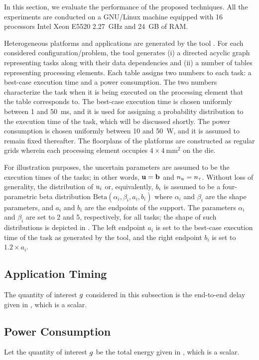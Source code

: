 In this section, we evaluate the performance of the proposed techniques. All the
experiments are conducted on a GNU/Linux machine equipped with 16 processors
Intel Xeon E5520 2.27~GHz and 24~GB of RAM.

Heterogeneous platforms and applications are generated by the  tool
\cite{dick1998}. For each considered configuration/problem, the tool generates
(i) a directed acyclic graph representing tasks along with their data
dependencies and (ii) a number of tables representing processing elements. Each
table assigns two numbers to each task: a best-case execution time and a power
consumption. The two numbers characterize the task when it is being executed on
the processing element that the table corresponds to. The best-case execution
time is chosen uniformly between 1 and 50~ms, and it is used for assigning a
probability distribution to the execution time of the task, which will be
discussed shortly. The power consumption is chosen uniformly between 10 and
50~W, and it is assumed to remain fixed thereafter. The floorplans of the
platforms are constructed as regular grids wherein each processing element
occupies $4 \times 4~\text{mm}^2$ on the die.


For illustration purposes, the uncertain parameters are assumed to be the
execution times of the tasks; in other words, $\mathbf{u} = \mathbf{b}$ and ${n_u} = {n_\tau}$.
Without loss of generality, the distribution of $u_i$ or, equivalently, $b_i$
is assumed to be a four-parametric beta distribution $\text{Beta}(\alpha_i,
\beta_i, a_i, b_i)$ where $\alpha_i$ and $\beta_i$ are the shape parameters, and
$a_i$ and $b_i$ are the endpoints of the support. The parameters $\alpha_i$ and
$\beta_i$ are set to 2 and 5, respectively, for all tasks; the shape of such
distributions is depicted in . The left endpoint $a_i$ is set to the
best-case execution time of the task as generated by the  tool, and
the right endpoint $b_i$ is set to $1.2 \times a_i$.

\subsection{Application Timing}
The quantity of interest $g$ considered in this subsection is the end-to-end
delay given in , which is a scalar.

\subsection{Power Consumption}
Let the quantity of interest $g$ be the total energy given in
, which is a scalar.

